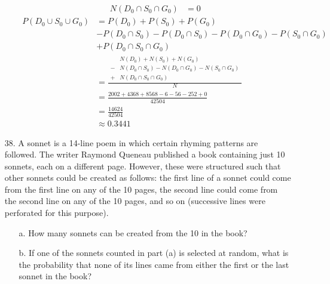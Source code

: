\documentclass[letterpaper,12pt]{article}
\begin{document}
\begin{enumerate}
\begin{enumerate}
\begin{align*}
          N(D_0 \cap S_0 \cap G_0) &= 0
        \end{align*}
        \begin{align*}
          P(D_0 \cup S_0 \cup G_0) &= P(D_0) + P(S_0) + P(G_0) \\
          &- P(D_0 \cap S_0) - P(D_0 \cap S_0) - P(D_0 \cap G_0) - P(S_0 \cap G_0) \\
          &+ P(D_0 \cap S_0 \cap G_0) \\
          &= \frac{\begin{aligned}
            &N(D_0) + N(S_0) + N(G_0) \\
            - &N(D_0 \cap S_0) - N(D_0 \cap G_0) - N(S_0 \cap G_0) \\
            + &N(D_0 \cap S_0 \cap G_0)
          \end{aligned}}{N} \\
          &= \frac{2002 + 4368 + 8568 - 6 - 56 - 252 + 0}{42504} \\
          &= \frac{14624}{42504} \\
          &\approx 0.3441
        \end{align*}
    \end{enumerate}
  \item[38.]
    A sonnet is a 14-line poem in which certain rhyming patterns are followed. The writer Raymond Queneau published a book containing just 10 sonnets, each on a different page. However, these were structured such that other sonnets could be created as follows: the first line of a sonnet could come from the first line on any of the 10 pages, the second line could come from the second line on any of the 10 pages, and so on (successive lines were perforated for this purpose).
    \begin{enumerate}
        \item[a.]
          How many sonnets can be created from the 10 in the book?
        \item[b.]
          If one of the sonnets counted in part (a) is selected at random, what is the probability that none of its lines came from either the first or the last sonnet in the book?
      \end{enumerate}
\end{enumerate}
\end{document}
